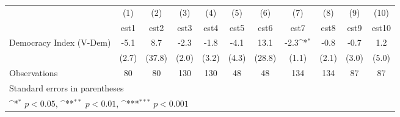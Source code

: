 {
\def\sym#1{\ifmmode^{#1}\else\(^{#1}\)\fi}
\begin{tabular}{l*{10}{c}}
\hline\hline
                    &\multicolumn{1}{c}{(1)}         &\multicolumn{1}{c}{(2)}         &\multicolumn{1}{c}{(3)}         &\multicolumn{1}{c}{(4)}         &\multicolumn{1}{c}{(5)}         &\multicolumn{1}{c}{(6)}         &\multicolumn{1}{c}{(7)}         &\multicolumn{1}{c}{(8)}         &\multicolumn{1}{c}{(9)}         &\multicolumn{1}{c}{(10)}         \\
                    &        est1         &        est2         &        est3         &        est4         &        est5         &        est6         &        est7         &        est8         &        est9         &       est10         \\
\hline
Democracy Index (V-Dem)&        -5.1         &         8.7         &        -2.3         &        -1.8         &        -4.1         &        13.1         &        -2.3\sym{*}  &        -0.8         &        -0.7         &         1.2         \\
                    &       (2.7)         &      (37.8)         &       (2.0)         &       (3.2)         &       (4.3)         &      (28.8)         &       (1.1)         &       (2.1)         &       (3.0)         &       (5.0)         \\
\hline
Observations        &          80         &          80         &         130         &         130         &          48         &          48         &         134         &         134         &          87         &          87         \\
\hline\hline
\multicolumn{11}{l}{\footnotesize Standard errors in parentheses}\\
\multicolumn{11}{l}{\footnotesize \sym{*} \(p<0.05\), \sym{**} \(p<0.01\), \sym{***} \(p<0.001\)}\\
\end{tabular}
}
